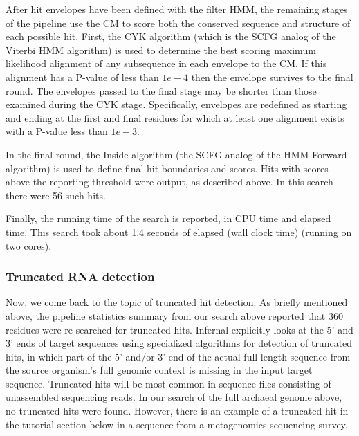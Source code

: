After hit envelopes have been defined with the filter HMM, the
remaining stages of the pipeline use the CM to score both the
conserved sequence and structure of each possible hit. First, the CYK
algorithm (which is the SCFG analog of the Viterbi HMM algorithm) is
used to determine the best scoring maximum likelihood alignment of any
subsequence in each envelope to the CM. If this alignment has a
P-value of less than $1e-4$ then the envelope survives to the final
round. The envelopes passed to the final stage may be shorter than
those examined during the CYK stage. Specifically, envelopes are
redefined as starting and ending at the first and final residues for
which at least one alignment exists with a P-value less than $1e-3$.

In the final round, the Inside algorithm (the SCFG analog of the HMM
Forward algorithm) is used to define final hit boundaries and
scores. Hits with scores above the reporting threshold were output, as
described above. In this search there were 56 such hits.

Finally, the running time of the search is reported, in CPU time and
elapsed time. This search took about 1.4 seconds of elapsed (wall
clock time) (running on two cores). 

\subsubsection{Truncated RNA detection}

Now, we come back to the topic of truncated hit detection.  As briefly
mentioned above, the pipeline statistics summary from our search above
reported that 360 residues were re-searched for truncated
hits. Infernal explicitly looks at the 5' and 3' ends of target
sequences using specialized algorithms for detection of truncated
hits, in which part of the 5' and/or 3' end of the actual full length
sequence from the source organism's full genomic context is missing in
the input target sequence. Truncated hits will be most common in
sequence files consisting of unassembled sequencing reads. In our
search of the full archaeal genome above, no truncated hits were
found. However, there is an example of a truncated hit in the
 tutorial section below in a sequence from a metagenomics
sequencing survey.

